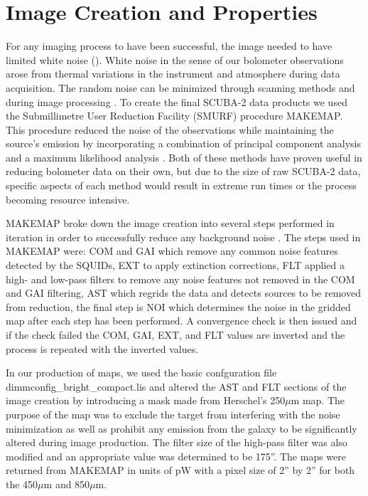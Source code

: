 \section{Image Creation and Properties}

For any imaging process to have been successful, the image needed to have limited white noise (\citet{chapin2013}).  White noise in the sense of our bolometer observations arose from thermal variations in the instrument and atmosphere during data acquisition. The random noise can be minimized through scanning methods and during image processing \citet{chapin2013}.  To create the final SCUBA-2 data products we used the Submillimetre User Reduction Facility (SMURF) procedure MAKEMAP.  This procedure reduced the noise of the observations while maintaining the source's emission by incorporating a combination of principal component analysis and a maximum likelihood analysis \citet{chapin2013}.  Both of these methods have proven useful in reducing bolometer data on their own, but due to the size of raw SCUBA-2 data, specific aspects of each method would result in extreme run times or the process becoming resource intensive.

MAKEMAP broke down the image creation into several steps performed in iteration in order to successfully reduce any background noise \citet{chapin2013}.  The steps used in MAKEMAP were:  COM and GAI which remove any common noise features detected by the SQUIDs, EXT to apply extinction corrections, FLT applied  a high- and low-pass filters to remove any noise features not removed in the COM and GAI filtering, AST which regrids the data and detects sources to be removed from reduction, the final step is NOI which determines the noise in the gridded map after each step has been performed.  A convergence check is then issued and if the check failed the COM, GAI, EXT, and FLT values are inverted and the process is repeated with the inverted values.

In our production of maps, we used the basic confguration file dimmconfig\_bright\_compact.lis and altered the AST and FLT sections of the image creation by introducing a mask made from Herschel's 250$\mu$m map.  The purpose of the map was to exclude the target from interfering with the noise minimization as well as prohibit any emission from the galaxy to be significantly altered during image production.  The filter size of the high-pass filter was also modified and an appropriate value was determined to be 175''.  The maps were returned from MAKEMAP in units of pW with a pixel size of 2'' by 2'' for both the 450$\mu$m and 850$\mu$m.

